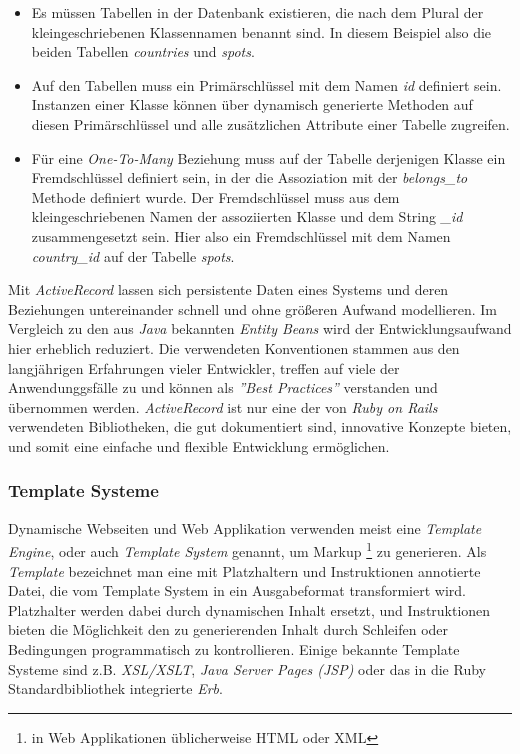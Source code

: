 \begin{itemize}
\item Es müssen Tabellen in der Datenbank existieren, die nach dem
  Plural der kleingeschriebenen Klassennamen benannt sind. In diesem
  Beispiel also die beiden Tabellen \textit{countries} und
  \textit{spots}.
\item Auf den Tabellen muss ein Primärschlüssel mit dem Namen
  \textit{id} definiert sein. Instanzen einer Klasse können über
  dynamisch generierte Methoden auf diesen Primärschlüssel und alle
  zusätzlichen Attribute einer Tabelle zugreifen.
\item Für eine \textit{One-To-Many} Beziehung muss auf der Tabelle
  derjenigen Klasse ein Fremdschlüssel definiert sein, in der die
  Assoziation mit der \textit{belongs\_to} Methode definiert
  wurde. Der Fremdschlüssel muss aus dem kleingeschriebenen Namen der
  assoziierten Klasse und dem String \textit{\_id} zusammengesetzt
  sein. Hier also ein Fremdschlüssel mit dem Namen
  \textit{country\_id} auf der Tabelle \textit{spots}.
\end{itemize}

Mit \textit{ActiveRecord} lassen sich persistente Daten eines Systems
und deren Beziehungen untereinander schnell und ohne größeren Aufwand
modellieren. Im Vergleich zu den aus \textit{Java} bekannten
\textit{Entity Beans} wird der Entwicklungsaufwand hier erheblich
reduziert. Die verwendeten Konventionen stammen aus den langjährigen
Erfahrungen vieler Entwickler, treffen auf viele der Anwendunggsfälle
zu und können als \textit{''Best Practices''} verstanden und
über\-nommen werden. \textit{ActiveRecord} ist nur eine der von
\textit{Ruby on Rails} verwendeten Bibliotheken, die gut dokumentiert
sind, innovative Konzepte bieten, und somit eine einfache und flexible
Entwicklung ermöglichen.

\subsubsection{Template Systeme}

Dynamische Webseiten und Web Applikation verwenden meist eine
\textit{Template Engine}, oder auch \textit{Template System} genannt,
um Markup \footnote{in Web Applikationen üblicherweise HTML oder XML}
zu generieren. Als \textit{Template} bezeichnet man eine mit
Platzhaltern und Instruktionen annotierte Datei, die vom Template
System in ein Ausgabeformat transformiert wird. Platzhalter werden
dabei durch dynamischen Inhalt ersetzt, und Instruktionen bieten die
Möglichkeit den zu generierenden Inhalt durch Schleifen oder
Bedingungen programmatisch zu kontrollieren. Einige bekannte Template
Systeme sind z.B. \textit{XSL/XSLT}, \textit{Java Server Pages (JSP)}
oder das in die Ruby Standardbibliothek integrierte \textit{Erb}.

